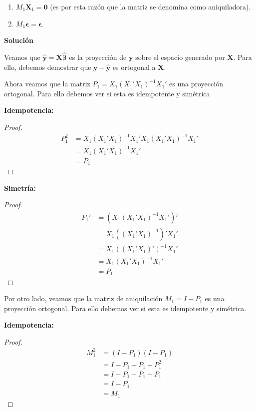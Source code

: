 \documentclass[a4paper, answers, addpoints, 11pt]{exam}
\newenvironment{solucion}{%
  \begin{mdframed}[
    backgroundcolor=blue!5,    %
    linecolor=blue!50,          %
    linewidth=2pt,              %
    leftmargin=10pt,            %
    rightmargin=10pt,           %
    topline=true,              %
    bottomline=true,            %
    roundcorner=10pt,           %
    innerleftmargin=10pt,       %
    innerrightmargin=10pt,      %
    innerbottommargin=10pt,     %
    innertopmargin=10pt         %
  ]%
  \begin{tcolorbox}[colframe=blue!50!black, colback=blue!50, coltitle=white, sharp corners=all, boxrule=1mm, width=\textwidth, halign=left, valign=center, top=0mm, bottom=0mm, left=0mm, right=0mm] \textbf{Solución} \end{tcolorbox} }{\end{mdframed}}
\begin{document}
\begin{enumerate}
    \begin{enumerate}\label{aniquiladoranotaciona}
        \item $M_1\textbf{X}_1 = \textbf{0}$ (es por esta razón que la matriz se denomina como aniquiladora).
        \item $M_1\boldsymbol\epsilon = \boldsymbol\epsilon$.
    \end{enumerate}


\begin{solucion}

Veamos que $\boldsymbol{\hat{y}} = \boldsymbol{X}\boldsymbol{\hat{\beta}}$ es la proyección de $\boldsymbol{y}$ sobre el espacio generado por $\boldsymbol{X}$. Para ello, debemos demostrar que $\boldsymbol{y} - \boldsymbol{\hat{y}}$ es ortogonal a $\boldsymbol{X}$.

Ahora veamos que la matriz $P_1 = X_1(X_1'X_1)^{-1}X_1'$ es una proyección ortogonal. Para ello debemos ver si esta es idempotente y simétrica

\textbf{Idempotencia:}
\begin{proof}
\begin{align*}
    P_1^2 &= X_1(X_1'X_1)^{-1}X_1'X_1(X_1'X_1)^{-1}X_1' \\
    &= X_1(X_1'X_1)^{-1}X_1' \\
    &= P_1
\end{align*}
\end{proof}

\textbf{Simetría:}
\begin{proof}
\begin{align*}
    P_1' &= \left( X_1(X_1'X_1)^{-1}X_1' \right)' \\
    &= X_1 \left( (X_1'X_1)^{-1} \right)' X_1' \\
    &= X_1 \left( (X_1'X_1)' \right)^{-1} X_1' \\
    &= X_1 (X_1'X_1)^{-1} X_1' \\
    &= P_1
\end{align*}
\end{proof}

Por otro lado, veamos que la matriz de aniquilación $M_1 = I - P_1$ es una proyección ortogonal. Para ello debemos ver si esta es idempotente y simétrica.

\textbf{Idempotencia:}
\begin{proof}
\begin{align*}
    M_1^2 &= (I - P_1)(I - P_1) \\
    &= I - P_1 - P_1 + P_1^2 \\
    &= I - P_1 - P_1 + P_1 \\
    &= I - P_1 \\
    &= M_1
\end{align*}
\end{proof}


\end{solucion}
\end{enumerate}
\end{document}
